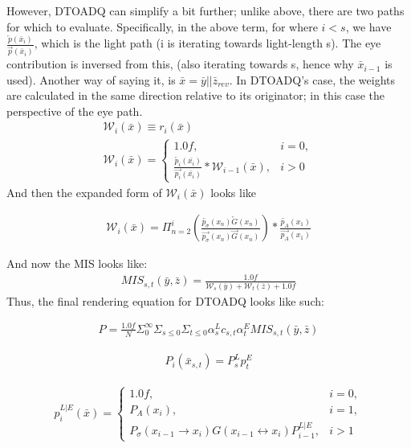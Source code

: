 \documentclass{article}
\begin{document}
    However, DTOADQ can simplify a bit further; unlike above, there are two
    paths for which to evaluate. Specifically, in the above term, for where
    $i < s$, we have
    $\frac{\overleftarrow{p}(\bar{x}_i)}{\overrightarrow{p}(\bar{x}_i)}$, 
    which is the light path (i is iterating towards light-length s). The eye
    contribution is inversed from this, (also iterating towards s, hence why
    $\bar{x}_{i-1}$ is used). Another way of saying it, is $\bar{x} = \bar{y} ||
    \bar{z}_{rev}$.
    In DTOADQ's case, the weights are calculated in
    the same direction relative to its originator; in this case the perspective
    of the eye path.
  \begin{align}
    \mathcal{W}_i(\bar{x}) \equiv r_i(\bar{x})\\
    \mathcal{W}_i (\bar{x}) = 
    \begin{cases}
      1.0f, & i = 0,\\
      \frac{\overleftarrow{p_i}(\bar{x_i})}{\overrightarrow{p_i}(\bar{x_i})} *
      \mathcal{W}_{i-1}(\bar{x}), & i > 0
    \end{cases}
  \end{align}
    And then the expanded form of $\mathcal{W}_i(\bar{x})$ looks like

  \begin{align}
    \mathcal{W}_i(\bar{x}) = \Pi_{n=2}^i(\frac{\overleftarrow
    {p_{\sigma}}(x_n)\overleftarrow {G}(x_n)}
    {\overrightarrow{p_{\sigma}}(x_n)\overrightarrow{G}(x_n)})
    * \frac{\overleftarrow{p_A}(x_1)}{\overrightarrow{p_A}(x_1)}
  \end{align}
 
    And now the MIS looks like:
  \begin{align}
    MIS_{s, t}(\bar{y}, \bar{z}) =
    \frac{1.0f}{\mathcal{W}_s(\bar{y}) + \mathcal{W}_t(\bar{z}) + 1.0f}
  \end{align}
    Thus, the final rendering equation for DTOADQ looks like such:

  \begin{align}
    P = \frac{1.0f}{N} \Sigma_{0}^{\infty} \Sigma_{s \le 0} \Sigma_{t \le 0}
    \alpha^L_s c_{s,t} \alpha^E_t MIS_{s, t}(\bar{y}, \bar{z})
  \end{align}


  \begin{align}
    P_i(\bar{x}_{s, t}) = P^L_s p^E_t
  \end{align}

  \begin{align}
    p^{L|E}_i(\bar{x}) =
    \begin{cases}
      1.0f, & i = 0,\\
      P_A(x_i), & i = 1,\\
      P_{\sigma}(x_{i-1} \rightarrow x_i) G(x_{i-1} \leftrightarrow x_i)
      P^{L|E}_{i-1}, & i > 1
    \end{cases}
  \end{align}
\end{document}
